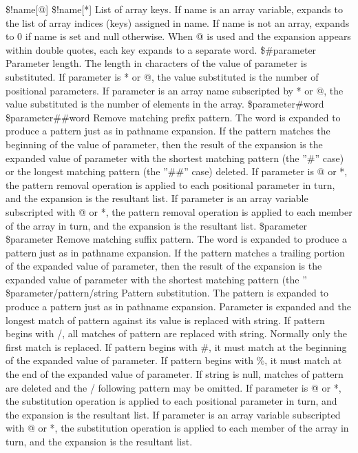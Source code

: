 {\${!name[@]}
\${!name[*]}
List of array keys. If name is an array variable, expands to the list of array indices (keys) assigned in name. If name is not an array, expands to 0 if name is set and null otherwise. When @ is used and the expansion appears within double quotes, each key expands to a separate word.
\${\#parameter}
Parameter length. The length in characters of the value of parameter is substituted. If parameter is * or @, the value substituted is the number of positional parameters. If parameter is an array name subscripted by * or @, the value substituted is the number of elements in the array.
\${parameter\#word}
\${parameter\#\#word}
Remove matching prefix pattern. The word is expanded to produce a pattern just as in pathname expansion. If the pattern matches the beginning of the value of parameter, then the result of the expansion is the expanded value of parameter with the shortest matching pattern (the ''\#'' case) or the longest matching pattern (the ''\#\#'' case) deleted. If parameter is @ or *, the pattern removal operation is applied to each positional parameter in turn, and the expansion is the resultant list. If parameter is an array variable subscripted with @ or *, the pattern removal operation is applied to each member of the array in turn, and the expansion is the resultant list.
\${parameter%
\${parameter%
Remove matching suffix pattern. The word is expanded to produce a pattern just as in pathname expansion. If the pattern matches a trailing portion of the expanded value of parameter, then the result of the expansion is the expanded value of parameter with the shortest matching pattern (the ''%
\${parameter/pattern/string}
Pattern substitution. The pattern is expanded to produce a pattern just as in pathname expansion. Parameter is expanded and the longest match of pattern against its value is replaced with string. If pattern begins with /, all matches of pattern are replaced with string. Normally only the first match is replaced. If pattern begins with \#, it must match at the beginning of the expanded value of parameter. If pattern begins with \%, it must match at the end of the expanded value of parameter. If string is null, matches of pattern are deleted and the / following pattern may be omitted. If parameter is @ or *, the substitution operation is applied to each positional parameter in turn, and the expansion is the resultant list. If parameter is an array variable subscripted with @ or *, the substitution operation is applied to each member of the array in turn, and the expansion is the resultant list.
}}}
